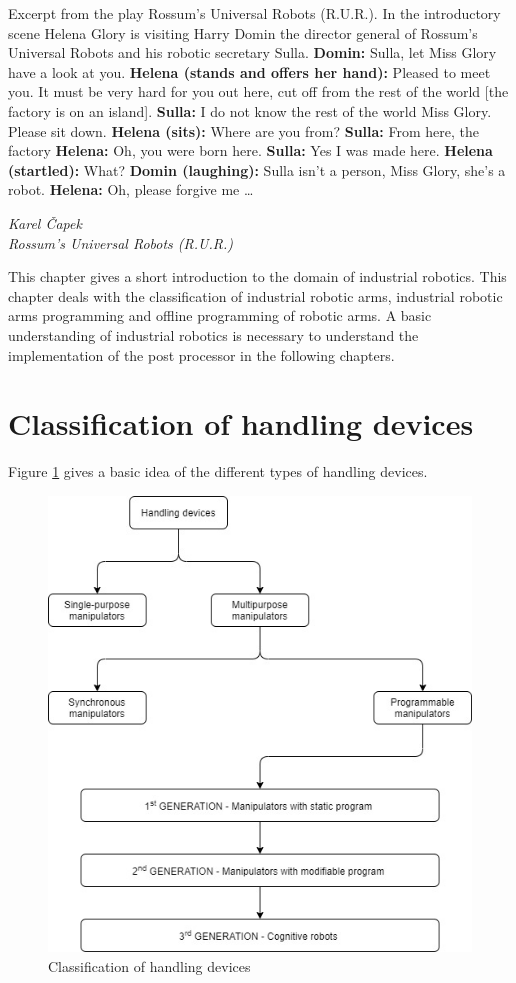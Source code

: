 \label{chap:basics}

\epigraph{

Excerpt from the play Rossum’s Universal Robots (R.U.R.).\break
In the introductory scene Helena Glory is visiting Harry Domin the director general of Rossum’s Universal Robots and his robotic secretary Sulla.\break
\break
\textbf{Domin:} Sulla, let Miss Glory have a look at you.\break
\textbf{Helena (stands and offers her hand):} Pleased to meet you. It must be very hard for you out here, cut off from the rest of the world [the factory is on an island].\break
\textbf{Sulla:} I do not know the rest of the world Miss Glory. Please sit down.\break
\textbf{Helena (sits):} Where are you from?\break
\textbf{Sulla:} From here, the factory\break
\textbf{Helena:} Oh, you were born here.\break
\textbf{Sulla:} Yes I was made here.\break
\textbf{Helena (startled):} What?\break
\textbf{Domin (laughing):} Sulla isn’t a person, Miss Glory, she’s a robot.\break
\textbf{Helena:} Oh, please forgive me …
}{\textit{Karel Čapek \\ Rossum’s Universal Robots (R.U.R.)}}

This chapter gives a short introduction to the domain of industrial robotics. This chapter deals with the classification of industrial robotic arms, industrial robotic arms programming and offline programming of robotic arms. A basic understanding of industrial robotics is necessary to understand the implementation of the post processor in the following chapters.

\section{Classification of handling devices}

Figure \ref{fig:manipulators} gives a basic idea of the different types of handling devices. 

\begin{figure}[h]
    \centering
    \includegraphics[width=0.8\linewidth]{img/manipulators.jpg}
    \caption{Classification of handling devices \cite{vsb_2007}}
    \label{fig:manipulators}
\end{figure}


